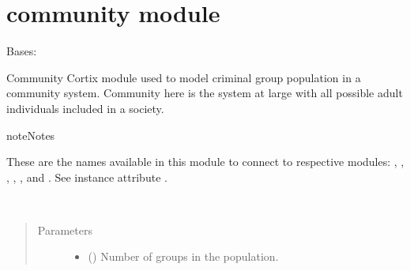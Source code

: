 \documentclass[letterpaper,10pt,openany,oneside,english]{sphinxmanual}
\begin{document}
\section{community module}
\label{\detokenize{examples_rst/community:module-community}}\label{\detokenize{examples_rst/community:community-module}}\label{\detokenize{examples_rst/community::doc}}

\begin{fulllineitems}
\label{\detokenize{examples_rst/community:community.Community}}
Bases: 

Community Cortix module used to model criminal group population in a community system.
Community here is the system at large with all possible adult individuals included
in a society.

\begin{sphinxadmonition}{note}{Notes}

These are the  names available in this module to connect to respective
modules: , , , , , and .
See instance attribute .
\end{sphinxadmonition}

\begin{fulllineitems}
\label{\detokenize{examples_rst/community:community.Community.__init__}}~\begin{quote}\begin{description}
\item[{Parameters}] \leavevmode\begin{itemize}
\item {} 
 () \textendash{} Number of groups in the population.


\end{itemize}
\end{description}
\end{quote}
\end{fulllineitems}
\end{fulllineitems}
\end{document}
